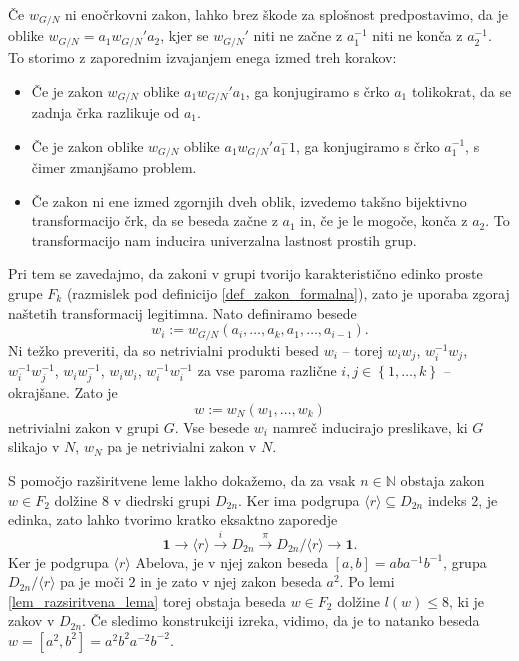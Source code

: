 \begin{dokaz}
        Če $w_{G / N}$ ni enočrkovni zakon, lahko brez škode za splošnost predpostavimo, da je oblike $w_{ G / N} = a_1 w_{ G / N}' a_2$, kjer se $w_{ G / N}'$ niti ne začne z $a_1^{-1}$ niti ne konča z $a_2^{-1}$.
        To storimo z zaporednim izvajanjem enega izmed treh korakov: \begin{itemize}
            \item Če je zakon $w_{ G / N}$ oblike $a_1 w_{ G / N}' a_1$, ga konjugiramo s črko $a_1$ tolikokrat, da se zadnja črka razlikuje od $a_1$.
            \item Če je zakon oblike $w_{ G / N}$ oblike $a_1 w_{ G / N}' a_1^-1$, ga konjugiramo s črko $a_1^{-1}$, s čimer zmanjšamo problem.
            \item Če zakon ni ene izmed zgornjih dveh oblik, izvedemo takšno bijektivno transformacijo črk, da se beseda začne z $a_1$ in, če je le mogoče, konča z $a_2$. To transformacijo nam inducira univerzalna lastnost prostih grup. 
        \end{itemize}
        Pri tem se zavedajmo, da zakoni v grupi tvorijo karakteristično edinko proste grupe $F_k$ (razmislek pod definicijo \ref{def_zakon_formalna}), zato je uporaba zgoraj naštetih transformacij legitimna. 
        Nato definiramo besede \begin{equation*}
   w_i := w_{ G / N}(a_{i}, \ldots, a_{k}, a_1, \ldots, a_{i - 1}).
   \end{equation*}  
   Ni težko preveriti, da so netrivialni produkti besed $w_i$ -- torej $w_{i} w_{j}$, $w_{i}^{-1} w_{j}$, \\ 
   $w_{i}^{-1} w_{j}^{-1}$,  $w_{i} w_{j}^{-1}$, $w_{i} w_{i}$, $w_{i}^{-1} w_{i}^{-1}$ za vse paroma različne $i,j \in \left\{ 1, \ldots, k \right\}$ -- okrajšane.
   Zato je \begin{equation*}
    w := w_N (w_1, \ldots, w_{k})
    \end{equation*}  
    netrivialni zakon v grupi $G$. Vse besede $w_{i}$ namreč inducirajo preslikave, ki $G$ slikajo v $N$, $w_N$ pa je netrivialni zakon v $N$.       
\end{dokaz}

\begin{primer}\label{prm_razsiritvena}
    S pomočjo razširitvene leme lakho dokažemo, da za vsak $n \in \mathbb{N}$ obstaja zakon $w \in F_2$ dolžine $8$ v diedrski grupi $D_{2n}$. Ker ima podgrupa $\langle r \rangle \subseteq D_{2n}$ indeks 2, je edinka,
    zato lahko tvorimo kratko eksaktno zaporedje \begin{equation*}
        \mathbf{1} \to \langle r \rangle  \xrightarrow{i} D_{2n} \xrightarrow{\pi} D_{2n} / \langle r \rangle  \to \mathbf{1}.
        \end{equation*}
        Ker je podgrupa $\langle r \rangle$ Abelova, je v njej zakon beseda $[a, b] = aba^{-1} b^{-1}$, grupa $D_{2n} / \langle r \rangle$ pa je moči $2$ in je zato v njej zakon beseda $a^2$. Po lemi \ref{lem_razsiritvena_lema} torej obstaja beseda $w \in F_2$ dolžine $l(w) \le  8$, ki je zakov v $D_{2n}$.
        Če sledimo konstrukciji izreka, vidimo, da je to natanko beseda $w = [a^2, b^2] = a^2 b^2 a^{-2} b^{-2}$.   
\end{primer}

